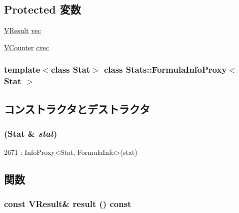 \subsection*{Protected 変数}
\begin{DoxyCompactItemize}
\item 
\hyperlink{classstd_1_1vector}{VResult} \hyperlink{classStats_1_1FormulaInfoProxy_a539785a2cf8aa37d52a6023051f9f797}{vec}
\item 
\hyperlink{classstd_1_1vector}{VCounter} \hyperlink{classStats_1_1FormulaInfoProxy_a8cc2f3a565a2e54ab797f717802bc894}{cvec}
\end{DoxyCompactItemize}
\subsubsection*{template$<$class Stat$>$ class Stats::FormulaInfoProxy$<$ Stat $>$}



\subsection{コンストラクタとデストラクタ}
\hypertarget{classStats_1_1FormulaInfoProxy_a94b5db43f2f6beda2d44a36aa20ad368}{
\subsubsection[{FormulaInfoProxy}]{ (Stat \& {\em stat})}}
\label{classStats_1_1FormulaInfoProxy_a94b5db43f2f6beda2d44a36aa20ad368}



\begin{DoxyCode}
2671 : InfoProxy<Stat, FormulaInfo>(stat) {}
\end{DoxyCode}


\subsection{関数}
\hypertarget{classStats_1_1FormulaInfoProxy_aba312f9e3431b1652f8b3ddf3fe105dc}{
\subsubsection[{result}]{\setlength{\rightskip}{0pt plus 5cm}const {\bf VResult}\& result () const}}
\label{classStats_1_1FormulaInfoProxy_aba312f9e3431b1652f8b3ddf3fe105dc}


